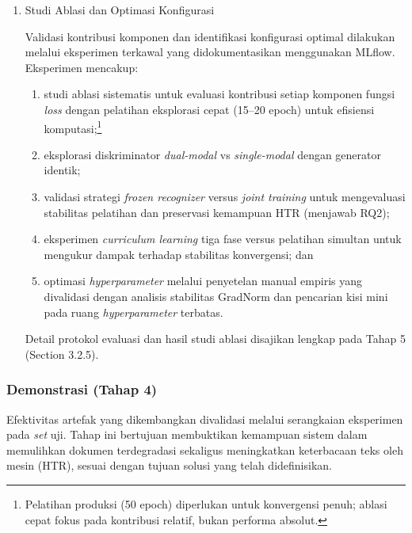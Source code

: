 \begin{enumerate}[label=Fase \arabic*, wide=0pt, itemsep=1em, resume]
    \item Studi Ablasi dan Optimasi Konfigurasi
    
    Validasi kontribusi komponen dan identifikasi konfigurasi optimal dilakukan melalui eksperimen terkawal yang didokumentasikan menggunakan MLflow. Eksperimen mencakup:
    \begin{enumerate}[label=(\arabic*), leftmargin=*, nosep]
        \item studi ablasi sistematis untuk evaluasi kontribusi setiap komponen fungsi \textit{loss} dengan pelatihan eksplorasi cepat (15--20 epoch) untuk efisiensi komputasi;\footnote{Pelatihan produksi (50 epoch) diperlukan untuk konvergensi penuh; ablasi cepat fokus pada kontribusi relatif, bukan performa absolut.}
        \item eksplorasi diskriminator \textit{dual-modal} vs \textit{single-modal} dengan generator identik;
        \item validasi strategi \textit{frozen recognizer} versus \textit{joint training} untuk mengevaluasi stabilitas pelatihan dan preservasi kemampuan HTR (menjawab RQ2);
        \item eksperimen \textit{curriculum learning} tiga fase versus pelatihan simultan untuk mengukur dampak terhadap stabilitas konvergensi; dan
        \item optimasi \textit{hyperparameter} melalui penyetelan manual empiris yang divalidasi dengan analisis stabilitas GradNorm dan pencarian kisi mini pada ruang \textit{hyperparameter} terbatas.
    \end{enumerate}
    Detail protokol evaluasi dan hasil studi ablasi disajikan lengkap pada Tahap 5 (Section 3.2.5).
\end{enumerate}


\subsubsection{Demonstrasi (Tahap 4)}
Efektivitas artefak yang dikembangkan divalidasi melalui serangkaian eksperimen pada \textit{set} uji. Tahap ini bertujuan membuktikan kemampuan sistem dalam memulihkan dokumen terdegradasi sekaligus meningkatkan keterbacaan teks oleh mesin (HTR), sesuai dengan tujuan solusi yang telah didefinisikan.

